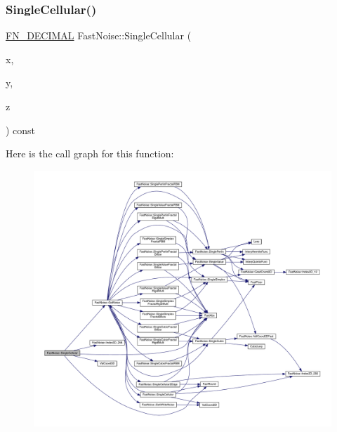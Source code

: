 \subsubsection{\texorpdfstring{Single\+Cellular()}{SingleCellular()}\hspace{0.1cm}{\footnotesize\ttfamily [2/2]}}
{\footnotesize\ttfamily \mbox{\hyperlink{_fast_noise_8h_a75a9ef6d2541c4921815b885bfd449c3}{F\+N\+\_\+\+D\+E\+C\+I\+M\+AL}} Fast\+Noise\+::\+Single\+Cellular (\begin{DoxyParamCaption}\item[{\mbox{\hyperlink{_fast_noise_8h_a75a9ef6d2541c4921815b885bfd449c3}{F\+N\+\_\+\+D\+E\+C\+I\+M\+AL}}}]{x,  }\item[{\mbox{\hyperlink{_fast_noise_8h_a75a9ef6d2541c4921815b885bfd449c3}{F\+N\+\_\+\+D\+E\+C\+I\+M\+AL}}}]{y,  }\item[{\mbox{\hyperlink{_fast_noise_8h_a75a9ef6d2541c4921815b885bfd449c3}{F\+N\+\_\+\+D\+E\+C\+I\+M\+AL}}}]{z }\end{DoxyParamCaption}) const\hspace{0.3cm}{\ttfamily [private]}}

Here is the call graph for this function\+:
\nopagebreak
\begin{figure}[H]
\begin{center}
\leavevmode
\includegraphics[width=350pt]{d1/dd8/class_fast_noise_a0d55ad41a81a37df679a5ed92cef2d36_cgraph}
\end{center}
\end{figure}
\mbox{\label{class_fast_noise_a2b9280204ddb0ffe0b8c3c6502cfe05e}} 
